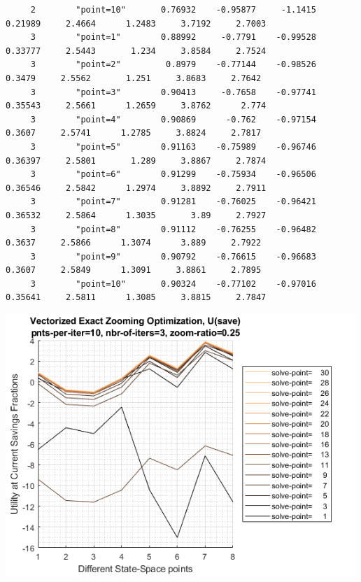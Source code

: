\documentclass[
]{book}
\begin{document}
\begin{verbatim}
     2        "point=10"       0.76932    -0.95877     -1.1415     0.21989     2.4664      1.2483     3.7192     2.7003
     3        "point=1"        0.88992     -0.7791    -0.99528     0.33777     2.5443       1.234     3.8584     2.7524
     3        "point=2"         0.8979    -0.77144    -0.98526      0.3479     2.5562       1.251     3.8683     2.7642
     3        "point=3"        0.90413     -0.7658    -0.97741     0.35543     2.5661      1.2659     3.8762      2.774
     3        "point=4"        0.90869      -0.762    -0.97154      0.3607     2.5741      1.2785     3.8824     2.7817
     3        "point=5"        0.91163    -0.75989    -0.96746     0.36397     2.5801       1.289     3.8867     2.7874
     3        "point=6"        0.91299    -0.75934    -0.96506     0.36546     2.5842      1.2974     3.8892     2.7911
     3        "point=7"        0.91281    -0.76025    -0.96421     0.36532     2.5864      1.3035       3.89     2.7927
     3        "point=8"        0.91112    -0.76255    -0.96482      0.3637     2.5866      1.3074      3.889     2.7922
     3        "point=9"        0.90792    -0.76615    -0.96683      0.3607     2.5849      1.3091     3.8861     2.7895
     3        "point=10"       0.90324    -0.77102    -0.97016     0.35641     2.5811      1.3085     3.8815     2.7847
\end{verbatim}

\includegraphics[width=5.20833in,height=\textheight]{img/fx_optim_mzoom_savezrone_images/figure_3.png}
\end{document}
